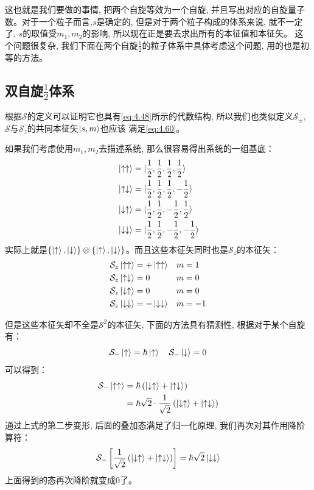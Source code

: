 \documentclass[a4paper,zihao=-4,linespread=1]{ctexrep}
\begin{document}
    这也就是我们要做的事情, 把两个自旋等效为一个自旋, 并且写出对应的自旋量子数。对于一个粒子而言,$s$是确定的, 但是对于两个粒子构成的体系来说, 就不一定了, $s$的取值受$m_1,m_2$的影响, 所以现在正是要去求出所有的本征值和本征矢。
    这个问题很复杂, 我们下面在两个自旋$\frac{1}{2}$的粒子体系中具体考虑这个问题, 用的也是初等的方法。

    \subsection*{双自旋$\frac{1}{2}$体系}
    根据$\mathcal{S}$的定义可以证明它也具有\ref{eq:4.48}所示的代数结构, 所以我们也类似定义$\mathcal{S_\pm}$, $\mathcal{S}$与$\mathcal{S}_z$的共同本征矢$\ket{s,m}$也应该
    满足\ref{eq:4.60}。

    如果我们考虑使用$m_1,m_2$去描述系统, 那么很容易得出系统的一组基底：
    \begin{equation}
        \label{eq:4.92}
        \begin{split}
            &\ket{\uparrow\uparrow}=\ket{\frac{1}{2},\frac{1}{2},\frac{1}{2},\frac{1}{2}}\\
            &\ket{\uparrow\downarrow}=\ket{\frac{1}{2},\frac{1}{2},\frac{1}{2},-\frac{1}{2}}\\
            &\ket{\downarrow\uparrow}=\ket{\frac{1}{2},\frac{1}{2},-\frac{1}{2},\frac{1}{2}}\\
            &\ket{\downarrow\downarrow}=\ket{\frac{1}{2},\frac{1}{2},-\frac{1}{2},-\frac{1}{2}}
        \end{split}
    \end{equation}
    实际上就是$\{\ket{\uparrow},\ket{\downarrow}\}\otimes\{\ket{\uparrow},\ket{\downarrow}\}$。而且这些本征矢同时也是$\mathcal{S}_z$的本征矢：
    \begin{align*}
        &\mathcal{S}_z\ket{\uparrow\uparrow}=+\ket{\uparrow\uparrow}&m&=1\\
        &\mathcal{S}_z\ket{\uparrow\downarrow}=0&m&=0\\
        &\mathcal{S}_z\ket{\downarrow\uparrow}=0&m&=0\\
        &\mathcal{S}_z\ket{\downarrow\downarrow}=-\ket{\downarrow\downarrow} &m&=-1
    \end{align*}
   
    但是这些本征矢却不全是$\mathcal{S}^2$的本征矢, 下面的方法具有猜测性, 根据对于某个自旋有：
    \[\mathcal{S}_-\ket{\uparrow}=\hbar\ket{\uparrow}\quad\mathcal{S}_-\ket{\downarrow}=0\]
    可以得到：
    \begin{align*}
        \mathcal{S}_-\ket{\uparrow\uparrow}&=\hbar\left(\ket{\downarrow\uparrow}+\ket{\uparrow\downarrow}\right)\\
        &=\hbar\sqrt{2}\cdot\frac{1}{\sqrt{2}}\left(\ket{\downarrow\uparrow}+\ket{\uparrow\downarrow}\right)
    \end{align*}
    通过上式的第二步变形, 后面的叠加态满足了归一化原理, 我们再次对其作用降阶算符：
    \[\mathcal{S}_-\left[\frac{1}{\sqrt{2}}\left(\ket{\downarrow\uparrow}+\ket{\uparrow\downarrow}\right)\right]=\hbar\sqrt{2}\ket{\downarrow\downarrow}\]
    上面得到的态再次降阶就变成$0$了。
\end{document}

